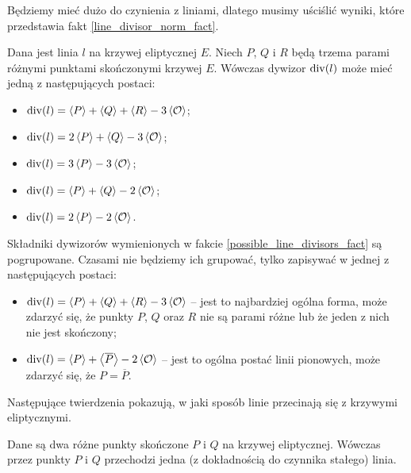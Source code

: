 Będziemy mieć dużo do czynienia z liniami,
dlatego musimy uściślić wyniki,
które przedstawia fakt \ref{line_divisor_norm_fact}.

\begin{fact}\label{possible_line_divisors_fact}
Dana jest linia $l$ na krzywej eliptycznej $E$.
Niech $P$, $Q$ i $R$ będą
trzema parami różnymi punktami skończonymi krzywej $E$.
Wówczas dywizor $\operatorname{div}(l)$ może mieć jedną z następujących postaci:
\begin{itemize}
\item $\operatorname{div}(l) = \left\langle P\right\rangle + \left\langle Q\right\rangle + \left\langle R\right\rangle - 3\left\langle\mathcal{O}\right\rangle$;
\item $\operatorname{div}(l) = 2\left\langle P\right\rangle + \left\langle Q\right\rangle - 3\left\langle\mathcal{O}\right\rangle$;
\item $\operatorname{div}(l) = 3\left\langle P\right\rangle - 3\left\langle\mathcal{O}\right\rangle$;
\item $\operatorname{div}(l) = \left\langle P\right\rangle + \left\langle Q\right\rangle - 2\left\langle\mathcal{O}\right\rangle$;
\item $\operatorname{div}(l) = 2\left\langle P\right\rangle - 2\left\langle\mathcal{O}\right\rangle$.
\end{itemize}
\end{fact}

\begin{remark}\label{possible_line_divisors_remark}
Składniki dywizorów wymienionych w fakcie \ref{possible_line_divisors_fact}
są pogrupowane. Czasami nie będziemy ich grupować,
tylko zapisywać w jednej z następujących postaci:
\begin{itemize}
\item $\operatorname{div}(l) = \left\langle P\right\rangle + \left\langle Q\right\rangle + \left\langle R\right\rangle - 3\left\langle\mathcal{O}\right\rangle$ --
jest to najbardziej ogólna forma,
może zdarzyć się, że punkty $P$, $Q$ oraz $R$ nie są parami różne
lub że jeden z nich nie jest skończony;
\item $\operatorname{div}(l) = \left\langle P\right\rangle + \left\langle\overline{P}\right\rangle - 2\left\langle\mathcal{O}\right\rangle$ --
jest to ogólna postać linii pionowych,
może zdarzyć się, że $P = \overline{P}$.
\end{itemize}
\end{remark}

Następujące twierdzenia pokazują,
w jaki sposób linie przecinają się z krzywymi eliptycznymi.

\begin{theorem}\label{line_through_two_points_theorem}
Dane są dwa różne punkty skończone $P$ i $Q$ na krzywej eliptycznej.
Wówczas przez punkty $P$ i $Q$
przechodzi jedna (z dokładnością do czynnika stałego) linia.
\end{theorem}

